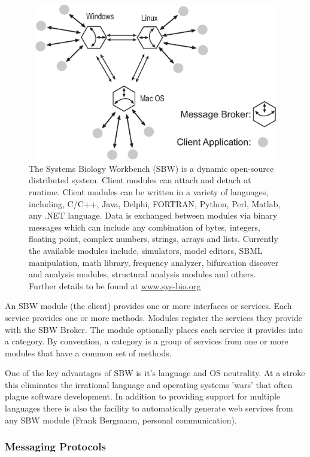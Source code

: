 \documentclass[12pt]{article}
\begin{document}
{\begin{figure}[h] \label{Figure:SBwFig}
\begin{center}
  \includegraphics[width=4.6in,height=2.7in]{sbwFig.eps}
\end{center}
\caption{The Systems Biology Workbench (SBW) is a dynamic open-source 
distributed system. Client modules can attach and detach at runtime. 
Client modules can be written in a variety of languages,
including, C/C++, Java, Delphi, FORTRAN, Python, Perl, Matlab, any .NET language.
Data is exchanged between modules via binary messages which can include any combination
of bytes, integers, floating point, complex numbers, strings, arrays and lists. Currently the available modules include, simulators, model editors, SBML manipulation, math library, frequency analyzer, bifurcation discover and analysis modules, structural analysis modules and others. Further details to be found at \url{www.sys-bio.org}}
\end{figure}

An SBW module (the client) provides one or more interfaces or services. Each
service provides one or more methods. Modules register the
services they provide with the SBW Broker. The module optionally
places each service it provides into a category. By convention, a
category is a group of services from one or more modules that have
a common set of methods.

One of the key advantages of SBW is it's language and OS
neutrality. At a stroke this eliminates the irrational language and operating
systems 'wars' that often plague software development. In addition
to providing support for multiple languages there is also the facility to
automatically generate web services from any SBW module (Frank Bergmann, personal communication).

\subsubsection*{Messaging Protocols}

}
\end{document}
